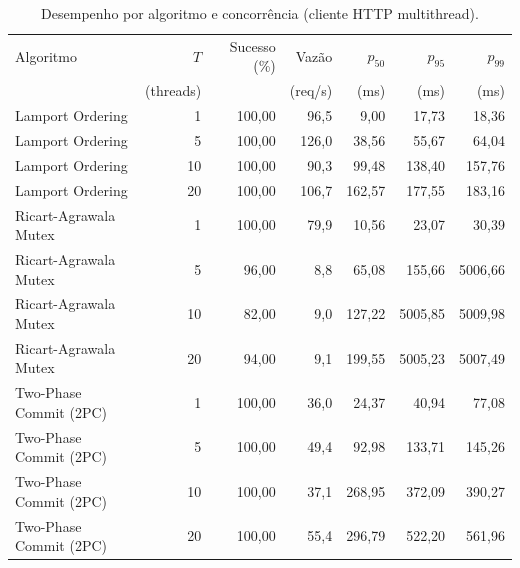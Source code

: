 \begin{table}[!t]
\centering
\caption{Desempenho por algoritmo e concorrência (cliente HTTP multithread).}
\label{tab:experiments}
\scriptsize
\setlength{\tabcolsep}{3pt}
\begin{tabular}{@{}l r r r r r r@{}}
\toprule
Algoritmo & $T$ & Sucesso (\%) & Vazão & $p_{50}$ & $p_{95}$ & $p_{99}$ \\
 & (threads) &  & (req/s) & (ms) & (ms) & (ms) \\
\midrule
Lamport Ordering & 1 & 100,00 & 96,5 & 9,00 & 17,73 & 18,36 \\
Lamport Ordering & 5 & 100,00 & 126,0 & 38,56 & 55,67 & 64,04 \\
Lamport Ordering & 10 & 100,00 & 90,3 & 99,48 & 138,40 & 157,76 \\
Lamport Ordering & 20 & 100,00 & 106,7 & 162,57 & 177,55 & 183,16 \\
Ricart-Agrawala Mutex & 1 & 100,00 & 79,9 & 10,56 & 23,07 & 30,39 \\
Ricart-Agrawala Mutex & 5 & 96,00 & 8,8 & 65,08 & 155,66 & 5006,66 \\
Ricart-Agrawala Mutex & 10 & 82,00 & 9,0 & 127,22 & 5005,85 & 5009,98 \\
Ricart-Agrawala Mutex & 20 & 94,00 & 9,1 & 199,55 & 5005,23 & 5007,49 \\
Two-Phase Commit (2PC) & 1 & 100,00 & 36,0 & 24,37 & 40,94 & 77,08 \\
Two-Phase Commit (2PC) & 5 & 100,00 & 49,4 & 92,98 & 133,71 & 145,26 \\
Two-Phase Commit (2PC) & 10 & 100,00 & 37,1 & 268,95 & 372,09 & 390,27 \\
Two-Phase Commit (2PC) & 20 & 100,00 & 55,4 & 296,79 & 522,20 & 561,96 \\
\bottomrule
\end{tabular}
\end{table}
